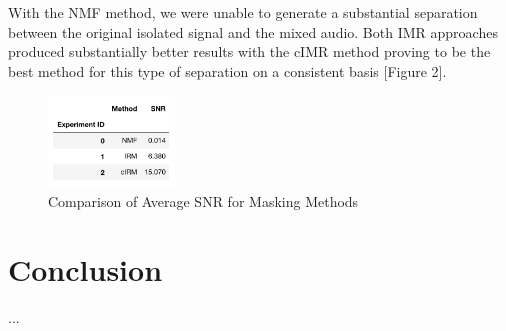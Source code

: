 \documentclass[journal, a4paper]{IEEEtran}
\begin{document}
With the NMF method, we were unable to generate a substantial separation between the original isolated signal and the mixed audio. Both IMR approaches produced substantially better results with the cIMR method proving to be the best method for this type of separation on a consistent basis [Figure 2].


\begin{figure}[h!]
    \centering  
     \caption{\label{Fig:Comparison of Average SNR for Masking Methods 1}Comparison of Average SNR for Masking Methods}  
    \includegraphics[width=0.3\textwidth]{Mask_Res.png}  
\end{figure}


\section{Conclusion}
...
\newline 



\end{document}
